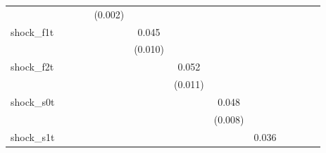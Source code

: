 {\begin{tabular}{l*{12}{c}}
            &                     &                     &                     &     (0.002)         &                     &                     &                     &                     &                     &                     &                     &                     \\
\addlinespace
shock\_f1t   &                     &                     &                     &                     &       0.045\sym{***}&                     &                     &                     &                     &                     &                     &                     \\
            &                     &                     &                     &                     &     (0.010)         &                     &                     &                     &                     &                     &                     &                     \\
\addlinespace
shock\_f2t   &                     &                     &                     &                     &                     &       0.052\sym{***}&                     &                     &                     &                     &                     &                     \\
            &                     &                     &                     &                     &                     &     (0.011)         &                     &                     &                     &                     &                     &                     \\
\addlinespace
shock\_s0t   &                     &                     &                     &                     &                     &                     &       0.048\sym{***}&                     &                     &                     &                     &                     \\
            &                     &                     &                     &                     &                     &                     &     (0.008)         &                     &                     &                     &                     &                     \\
\addlinespace
shock\_s1t   &                     &                     &                     &                     &                     &                     &                     &       0.036\sym{***}&                     &                     &                     &                     \\

\end{tabular}}
